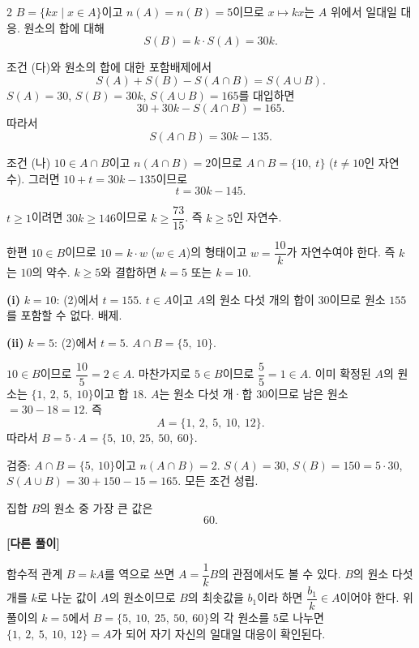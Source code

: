 \documentclass[10pt,fleqn]{article}
\renewcommand{\solpart}[1]{%
  \par\addvspace{10pt}\noindent
  {\sffamily\bfseries\color{black}(#1)}\hspace{3mm}\ignorespaces%
}
\newcommand{\solalt}{%
  \par\addvspace{8pt}\noindent
  \textcolor{gjAltGray}{\sffamily\bfseries [다른 풀이]}\quad\ignorespaces%
}
\begin{document}
\begin{multicols}{2}
$B = \{kx \mid x \in A\}$이고 $n(A) = n(B) = 5$이므로 $x \mapsto kx$는 $A$ 위에서 일대일 대응. 원소의 합에 대해
\[ S(B) = k \cdot S(A) = 30 k. \]

조건 (다)와 원소의 합에 대한 포함배제에서
\[ S(A) + S(B) - S(A \cap B) = S(A \cup B). \]
$S(A) = 30$, $S(B) = 30 k$, $S(A \cup B) = 165$를 대입하면
\[ 30 + 30 k - S(A \cap B) = 165. \]
따라서
\[ S(A \cap B) = 30 k - 135. \tag{1} \]

조건 (나) $10 \in A \cap B$이고 $n(A \cap B) = 2$이므로 $A \cap B = \{10,\ t\}$ ($t \ne 10$인 자연수). 그러면 $10 + t = 30 k - 135$이므로
\[ t = 30 k - 145. \tag{2} \]

$t \ge 1$이려면 $30 k \ge 146$이므로 $k \ge \dfrac{73}{15}$. 즉 $k \ge 5$인 자연수.

한편 $10 \in B$이므로 $10 = k \cdot w$ ($w \in A$)의 형태이고 $w = \dfrac{10}{k}$가 자연수여야 한다. 즉 $k$는 $10$의 약수. $k \ge 5$와 결합하면 $k = 5$ 또는 $k = 10$.

\solpart{i} $k = 10$: (2)에서 $t = 155$. $t \in A$이고 $A$의 원소 다섯 개의 합이 $30$이므로 원소 $155$를 포함할 수 없다. 배제.

\solpart{ii} $k = 5$: (2)에서 $t = 5$. $A \cap B = \{5,\ 10\}$.

$10 \in B$이므로 $\dfrac{10}{5} = 2 \in A$. 마찬가지로 $5 \in B$이므로 $\dfrac{5}{5} = 1 \in A$. 이미 확정된 $A$의 원소는 $\{1,\ 2,\ 5,\ 10\}$이고 합 $18$. $A$는 원소 다섯 개·합 $30$이므로 남은 원소 $= 30 - 18 = 12$. 즉
\[ A = \{1,\ 2,\ 5,\ 10,\ 12\}. \]
따라서 $B = 5 \cdot A = \{5,\ 10,\ 25,\ 50,\ 60\}$.

검증: $A \cap B = \{5,\ 10\}$이고 $n(A \cap B) = 2$. $S(A) = 30$, $S(B) = 150 = 5 \cdot 30$, $S(A \cup B) = 30 + 150 - 15 = 165$. 모든 조건 성립.

집합 $B$의 원소 중 가장 큰 값은
\[ 60. \]

\solalt
함수적 관계 $B = k A$를 역으로 쓰면 $A = \dfrac{1}{k} B$의 관점에서도 볼 수 있다. $B$의 원소 다섯 개를 $k$로 나눈 값이 $A$의 원소이므로 $B$의 최솟값을 $b_{1}$이라 하면 $\dfrac{b_{1}}{k} \in A$이어야 한다. 위 풀이의 $k = 5$에서 $B = \{5,\ 10,\ 25,\ 50,\ 60\}$의 각 원소를 $5$로 나누면 $\{1,\ 2,\ 5,\ 10,\ 12\} = A$가 되어 자기 자신의 일대일 대응이 확인된다.



\end{multicols}
\end{document}
